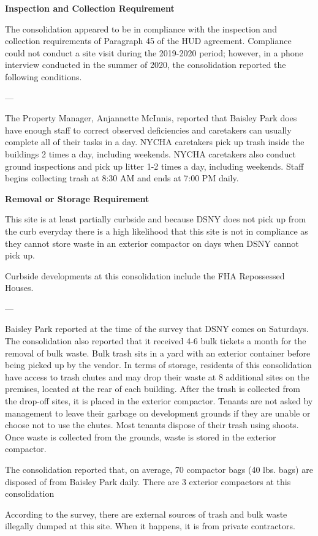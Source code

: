 

\textbf{Inspection and Collection Requirement}

The consolidation appeared to be in compliance with the inspection and collection requirements of Paragraph 45 of the HUD agreement. Compliance could not conduct a site visit during the 2019-2020 period; however, in a phone interview conducted in the summer of 2020, the consolidation reported the following conditions.

---

The Property Manager, Anjannette McInnis, reported that Baisley Park does have enough staff to correct observed deficiencies and caretakers can usually complete all of their tasks in a day. NYCHA caretakers pick up trash inside the buildings 2 times a day, including weekends. NYCHA caretakers also conduct ground inspections and pick up litter 1-2 times a day, including weekends. Staff begins collecting trash at 8:30 AM and ends at 7:00 PM daily. 

\textbf{Removal or Storage Requirement}

This site is at least partially curbside and because DSNY does not pick up from the curb everyday there is a high likelihood that this site is not in compliance as they cannot store waste in an exterior compactor on days when DSNY cannot pick up.

Curbside developments at this consolidation include the FHA Repossessed Houses.

---

Baisley Park reported at the time of the survey that DSNY comes on Saturdays. The consolidation also reported that it received 4-6 bulk tickets a month for the removal of bulk waste. Bulk trash sits in a yard with an exterior container before being picked up by the vendor. In terms of storage, residents of this consolidation have access to trash chutes and may drop their waste at 8 additional sites on the premises, located at the rear of each building. After the trash is collected from the drop-off sites, it is placed in the exterior compactor. Tenants are not asked by management to leave their garbage on development grounds if they are unable or choose not to use the chutes. Most tenants dispose of their trash using shoots. Once waste is collected from the grounds, waste is stored in the exterior compactor. 

The consolidation reported that, on average, 70 compactor bags (40 lbs. bags) are disposed of from Baisley Park daily. There are 3 exterior compactors at this consolidation 

According to the survey, there are external sources of trash and bulk waste illegally dumped at this site. When it happens, it is from private contractors.